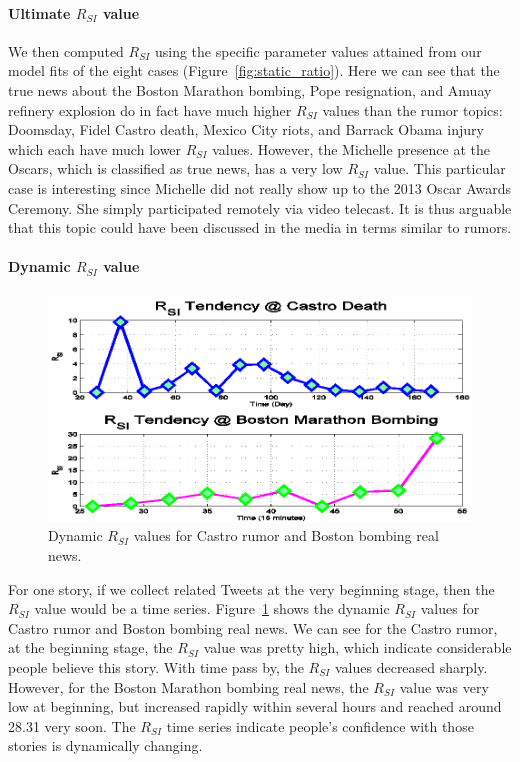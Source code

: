 \paragraph{Ultimate $R_{SI}$ value}
We then computed $R_{SI}$ using the specific parameter values attained from our model fits of the eight cases (Figure~\ref{fig:static_ratio}).
Here we can see that the true news about the Boston Marathon bombing, Pope resignation, and Amuay refinery explosion do in fact have much higher $R_{SI}$ values than the rumor topics: Doomsday, Fidel Castro death, Mexico City riots, and Barrack Obama injury which each have much lower $R_{SI}$ values. However, the Michelle presence at the Oscars, which is classified as true news, has a very low $R_{SI}$ value. This particular case is interesting since Michelle did not really show up to the 2013 Oscar Awards Ceremony. She simply participated remotely via video telecast. It is thus arguable that this topic could have been discussed in the media in terms similar to rumors.

\paragraph{Dynamic $R_{SI}$ value}

\begin{figure}[th]
\centering
  \includegraphics[width=4.5in]{pictures/Castro-Boston-realtime-RSI.png}
   \caption{Dynamic $R_{SI}$ values for Castro rumor and Boston bombing real news.}
  \label{fig:dynamic_castro_ratio}
\end{figure}

For one story, if we collect related Tweets at the very beginning stage, then the $R_{SI}$ value would be a time series. Figure~\ref{fig:dynamic_castro_ratio} shows the dynamic $R_{SI}$ values for Castro rumor and Boston bombing real news. We can see for the Castro rumor, at the beginning stage, the $R_{SI}$ value was pretty high, which indicate considerable people believe this story. With time pass by, the $R_{SI}$ values decreased sharply. However, for the Boston Marathon bombing real news, the $R_{SI}$ value was very low at beginning, but increased rapidly within several hours and reached around 28.31 very soon. The $R_{SI}$ time series indicate people's confidence with those stories is dynamically changing.


